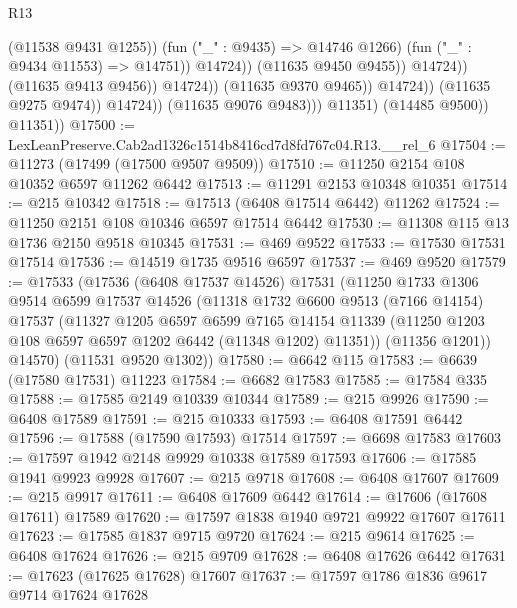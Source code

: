 \begin{lexlean}{R13}
\begin{coremodule}
                                                (@11538 @9431 @1255))
                                              (fun ("_" : @9435) => @14746 @1266)
                                              (fun ("_" : @9434 @11553) => @14751))
                                            @14724))
                                        (@11635 @9450 @9455))
                                      @14724))
                                  (@11635 @9413 @9456))
                                @14724))
                            (@11635 @9370 @9465))
                          @14724))
                      (@11635 @9275 @9474))
                    @14724))
                (@11635 @9076 @9483)))
            @11351)
          (@14485 @9500))
        @11351))
@17500 := LexLeanPreserve.Cab2ad1326c1514b8416cd7d8fd767c04.R13.__rel_6
@17504 := @11273 (@17499 (@17500 @9507 @9509))
@17510 := @11250 @2154 @108 @10352 @6597 @11262 @6442
@17513 := @11291 @2153 @10348 @10351
@17514 := @215 @10342
@17518 := @17513 (@6408 @17514 @6442) @11262
@17524 := @11250 @2151 @108 @10346 @6597 @17514 @6442
@17530 := @11308 @115 @13 @1736 @2150 @9518 @10345
@17531 := @469 @9522
@17533 := @17530 @17531 @17514
@17536 := @14519 @1735 @9516 @6597
@17537 := @469 @9520
@17579 := @17533
    (@17536
      (@6408 @17537 @14526)
      @17531
      (@11250
        @1733
        @1306
        @9514
        @6599
        @17537
        @14526
        (@11318
          @1732
          @6600
          @9513
          (@7166 @14154)
          @17537
          (@11327
            @1205
            @6597
            @6599
            @7165
            @14154
            @11339
            (@11250 @1203 @108 @6597 @6597 @1202 @6442 (@11348 @1202) @11351))
          (@11356 @1201))
        @14570)
      (@11531 @9520 @1302))
@17580 := @6642 @115
@17583 := @6639 (@17580 @17531) @11223
@17584 := @6682 @17583
@17585 := @17584 @335
@17588 := @17585 @2149 @10339 @10344
@17589 := @215 @9926
@17590 := @6408 @17589
@17591 := @215 @10333
@17593 := @6408 @17591 @6442
@17596 := @17588 (@17590 @17593) @17514
@17597 := @6698 @17583
@17603 := @17597 @1942 @2148 @9929 @10338 @17589 @17593
@17606 := @17585 @1941 @9923 @9928
@17607 := @215 @9718
@17608 := @6408 @17607
@17609 := @215 @9917
@17611 := @6408 @17609 @6442
@17614 := @17606 (@17608 @17611) @17589
@17620 := @17597 @1838 @1940 @9721 @9922 @17607 @17611
@17623 := @17585 @1837 @9715 @9720
@17624 := @215 @9614
@17625 := @6408 @17624
@17626 := @215 @9709
@17628 := @6408 @17626 @6442
@17631 := @17623 (@17625 @17628) @17607
@17637 := @17597 @1786 @1836 @9617 @9714 @17624 @17628

\end{coremodule}
\end{lexlean}
